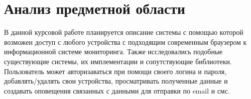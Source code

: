 
    \section{Анализ предметной области}
    В данной курсовой работе планируется описание системы с помощью которой
возможен доступ с любого устройства с подходящим современным браузером 
к информационной системе мониторинга. Также исследовались подобные существующие системы,
их имплементации и сопутствующие библиотеки.
Пользователь может авторизаваться при помощи своего логина и пароля, добавлять/удалять свои 
устройства, просматривать полученные данные и создавать оповещения связанных с данными
для отправки по email и смс.

